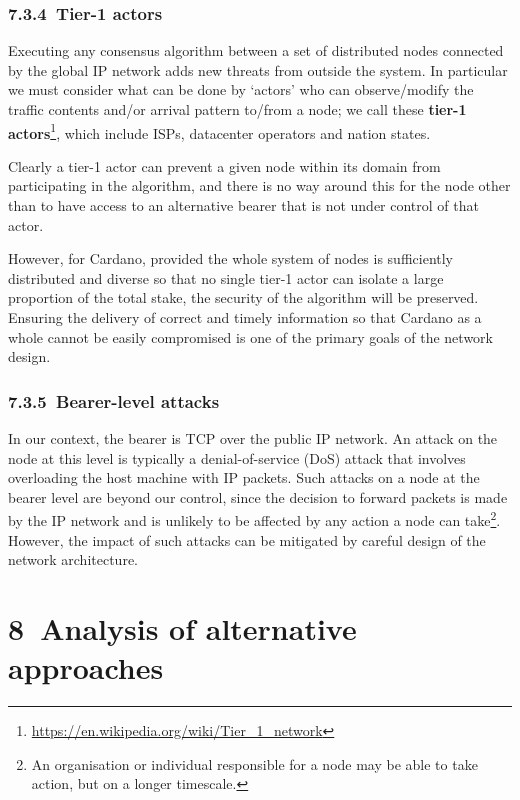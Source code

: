 \documentclass[]{article}
\begin{document}
\hypertarget{tier-1-actors}{%
\subsubsection{​7.3.4​~Tier-1 actors}\label{tier-1-actors}}

Executing any consensus algorithm between a set of distributed nodes
connected by the global IP network adds new threats from outside the
system. In particular we must consider what can be done by `actors' who
can observe/modify the traffic contents and/or arrival pattern to/from a
node; we call these \textbf{tier-1 actors}\footnote{\href{https://en.wikipedia.org/wiki/Tier_1_network}{{https://en.wikipedia.org/wiki/Tier\_1\_network}}},
which include ISPs, datacenter operators and nation states.

Clearly a tier-1 actor can prevent a given node within its domain from
participating in the algorithm, and there is no way around this for the
node other than to have access to an alternative bearer that is not
under control of that actor.

However, for Cardano, provided the whole system of nodes is sufficiently
distributed and diverse so that no single tier-1 actor can isolate a
large proportion of the total stake, the security of the algorithm will
be preserved. Ensuring the delivery of correct and timely information so
that Cardano as a whole cannot be easily compromised is one of the
primary goals of the network design.

\hypertarget{bearer-level-attacks}{%
\subsubsection{​7.3.5​~Bearer-level
attacks}\label{bearer-level-attacks}}

In our context, the bearer is TCP over the public IP network. An attack
on the node at this level is typically a denial-of-service (DoS) attack
that involves overloading the host machine with IP packets. Such attacks
on a node at the bearer level are beyond our control, since the decision
to forward packets is made by the IP network and is unlikely to be
affected by any action a node can take\footnote{An organisation or
  individual responsible for a node may be able to take action, but on a
  longer timescale.}. However, the impact of such attacks can be
mitigated by careful design of the network architecture.

\hypertarget{analysis-of-alternative-approaches}{%
\section{​8​~Analysis of alternative
approaches}\label{analysis-of-alternative-approaches}}
\end{document}
